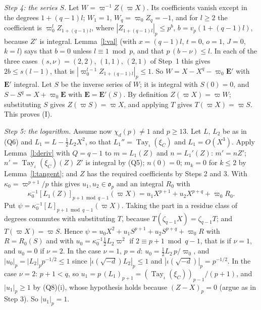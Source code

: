 \documentclass[11pt,a4paper]{article}
\makeatletter
\theoremstyle{plainx}
\theoremstyle{uprightx}
\renewenvironment{proof}[1][Proof]{\par\pushQED{\qed}\normalfont\topsep0pt\partopsep0pt
  \trivlist\item[\hskip\labelsep\itshape #1.]\ignorespaces}{\popQED\endtrivlist\@endpefalse}
\newcommand{\op}{\mathfrak{o}_p}
\newcommand{\np}[1]{|#1|_p}
\newcommand{\chid}[1]{\chi_{#1}}
\newcommand{\xiC}[1]{\xi_{#1}}
\newcommand{\tayj}[1]{\operatorname{Tay}_\iota(#1)}
\newcommand{\cpart}[3]{[#3]_{#2\bmod #1}}
\makeatother
\begin{document}
\begin{proof}
\emph{Step 4: the series $S$.} Let $W=\varpi^{-1}Z(\varpi X)$. Its coefficients vanish except in the degrees
$1+(q-1)l$; $W_1=1$, $W_q=\varpi_0 Z_q=-1$, and for $l\ge2$ the coefficient is $\varpi_0^{l}Z_{1+(q-1)l}$, where
$\np{Z_{1+(q-1)l}}\le p^{b}$, $b=v_p(1+(q-1)l)$, because $Z'$ is integral. Lemma~\ref{l:val} (with $x=(q-1)l$, $t=0$,
$o=1$, $J=0$, $k=l$) says that $b=0$ unless $l\equiv1\bmod p$, and that $p\,(b-\nu)\le l$. In each of the three cases
$(s,\nu)=(2,2)$, $(1,1)$, $(2,1)$ of Step~1 this gives $2b\le s(l-1)$, that is $\np{\varpi_0^{l-1}Z_{1+(q-1)l}}\le1$. So
$W=X-X^q-\varpi_0 \mathbf{E}'$ with $\mathbf{E}'$ integral. Let $S$ be the inverse series of $W$; it is integral with $S(0)=0$, and
$S-S^q=X+\varpi_0 \mathbf{E}$ with $\mathbf{E}=\mathbf{E}'(S)$. By definition $Z(\varpi X)=\varpi W$; substituting $S$ gives $Z(\varpi S)=\varpi X$,
and applying $T$ gives $T(\varpi X)=\varpi S$. This proves (I).

\emph{Step 5: the logarithm.} Assume now $\chid{d}(p)\ne1$ and $p\ge13$. Let $L$, $L_2$ be as in (Q6) and
$L_1=L-\tfrac12L_2X^2$, so that $L_1''=\tayj{\xiC{C}}$ and $L_1=O(X^3)$. Apply Lemma~\ref{l:deriv} with $Q=q-1$
to $m=L_1(Z)$ and $n=L_1'(Z)$: $m'=nZ'$; $n'=\tayj{\xiC{C}}(Z)\,Z'$ is integral by (Q5); $n(0)=0$; $m_k=0$ for
$k\le2$ by Lemma~\ref{l:tangent}; and $Z$ has the required coefficients by Steps 2 and 3. With
$\kappa_0=\varpi^{p+1}/p$ this gives $u_1,u_2\in\op$ and an integral $R_0$ with
\[\kappa_0^{-1}\cpart{q-1}{p+1}{L_1(Z)}(\varpi X)=u_1X^{p+1}+u_2X^{p+q}+\varpi_0 R_0 .\]
Put $\psi=\kappa_0^{-1}\cpart{q-1}{p+1}{L}(\varpi X)$. Taking the part in a residue class of degrees commutes with
substituting $T$, because $T(\zeta_{q-1} X)=\zeta_{q-1} T$; and $T(\varpi X)=\varpi S$. Hence
$\psi=u_0X^2+u_1S^{p+1}+u_2S^{p+q}+\varpi_0 R$ with $R=R_0(S)$ and with $u_0=\kappa_0^{-1}\tfrac12L_2\varpi^2$ if
$2\equiv p+1\bmod q-1$, that is if $\nu=1$, and $u_0=0$ if $\nu=2$. In the case $\nu=1$, $p=d$: $u_0=\tfrac12L_2\,p/\varpi_0$,
and $\np{u_0}=\np{L_2}p^{-1/2}\le1$ since $\np{\iota(\sqrt{-d})L_2}\le1$ and $\np{\iota(\sqrt{-d})}=p^{-1/2}$. In the case
$\nu=2$: $p+1<q$, so $u_1=p\,(L_1)_{p+1}=(\tayj{\xiC{C}})_{p-1}/(p+1)$, and $\np{u_1}\ge1$ by (Q8)(i), whose hypothesis
holds because $(Z-X)_p=0$ (argue as in Step 3). So $\np{u_1}=1$.


\end{proof}
\end{document}
